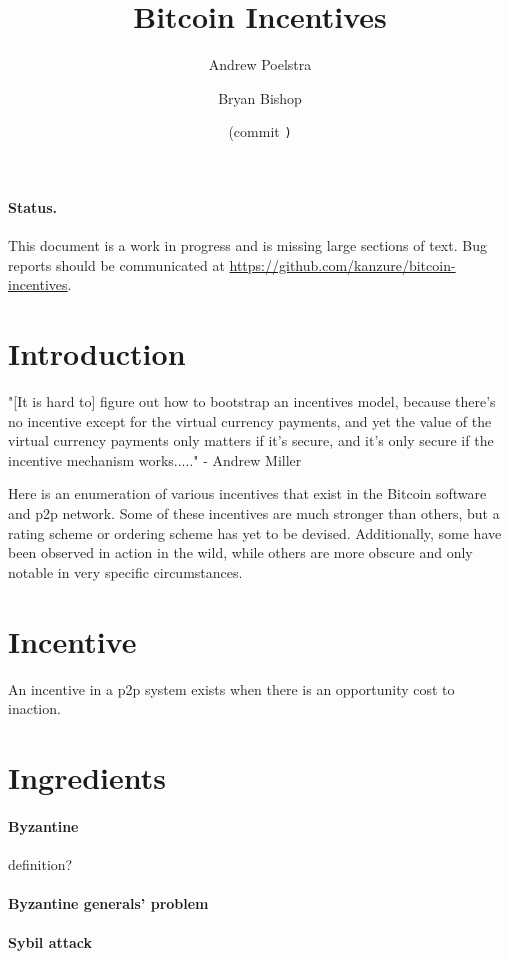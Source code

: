 \documentclass[letterpaper]{article}
\title{Bitcoin Incentives}
\author{Andrew Poelstra}
\author{Bryan Bishop}
\date{\gitAuthorDate{} (commit \texttt{\gitAbbrevHash)}}
\begin{document}
\maketitle

\paragraph{Status.} This document is a work in progress and is missing large
sections of text. Bug reports should be communicated at
\url{https://github.com/kanzure/bitcoin-incentives}.

\section{Introduction}

"[It is hard to] figure out how to bootstrap an incentives model, because
there's no incentive except for the virtual currency payments, and yet the
value of the virtual currency payments only matters if it's secure, and it's
only secure if the incentive mechanism works....." - Andrew Miller

Here is an enumeration of various incentives that exist in the Bitcoin software
and p2p network. Some of these incentives are much stronger than others, but a
rating scheme or ordering scheme has yet to be devised. Additionally, some have
been observed in action in the wild, while others are more obscure and only
notable in very specific circumstances.

\section{Incentive}

An incentive in a p2p system exists when there is an opportunity cost to
inaction.

\section{Ingredients}

\paragraph{Byzantine} definition?

\paragraph{Byzantine generals' problem}

\paragraph{Sybil attack}
\end{document}
